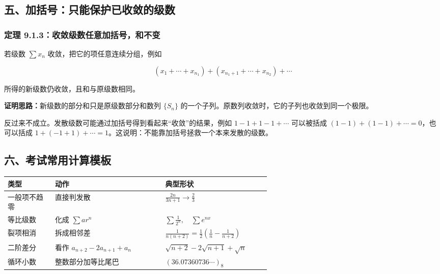 \subsection*{五、加括号：只能保护已收敛的级数}

\subsubsection*{定理 9.1.3：收敛级数任意加括号，和不变}

若级数 \(\sum x_n\) 收敛，把它的项任意连续分组，例如

\[
      (x_1+\cdots+x_{n_1})+(x_{n_1+1}+\cdots+x_{n_2})+\cdots
    \]

所得的新级数仍收敛，且和与原级数相同。

\textbf{证明思路：}新级数的部分和只是原级数部分和数列 \(\{S_n\}\) 的一个子列。原数列收敛时，它的子列也收敛到同一个极限。

\begin{notebox}
反过来不成立。发散级数可能通过加括号得到看起来“收敛”的结果，例如 \(1-1+1-1+\cdots\) 可以被括成 \((1-1)+(1-1)+\cdots=0\)，也可以括成 \(1+(-1+1)+\cdots=1\)。这说明：不能靠加括号拯救一个本来发散的级数。
\end{notebox}

\subsection*{六、考试常用计算模板}

\begin{center}
\small
\begin{tabularx}{\linewidth}{|>{\raggedright\arraybackslash}p{0.18\linewidth}|>{\raggedright\arraybackslash}p{0.42\linewidth}|>{\raggedright\arraybackslash}X|}
\hline
\textbf{类型} & \textbf{动作} & \textbf{典型形状} \\ \hline
一般项不趋零 & 直接判发散 & \(\displaystyle \frac{2n}{3n+1}\to\frac23\) \\ \hline
等比级数 & 化成 \(\sum ar^n\) & \(\displaystyle \sum \frac{1}{2^n},\quad \sum e^{nx}\) \\ \hline
裂项相消 & 拆成相邻差 & \(\displaystyle \frac1{n(n+2)}=\frac12\left(\frac1n-\frac1{n+2}\right)\) \\ \hline
二阶差分 & 看作 \(a_{n+2}-2a_{n+1}+a_n\) & \(\sqrt{n+2}-2\sqrt{n+1}+\sqrt n\) \\ \hline
循环小数 & 整数部分加等比尾巴 & \((36.07360736\cdots)_8\) \\ \hline
\end{tabularx}
\end{center}

